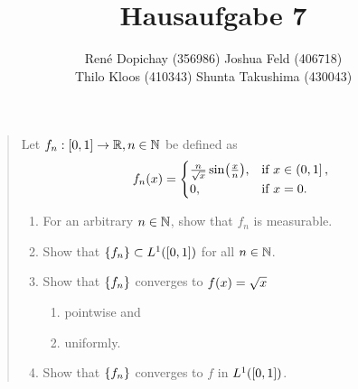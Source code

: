 \documentclass{exercise}
\title{Hausaufgabe 7}
\author{René Dopichay (356986) \quad Joshua Feld (406718)\\Thilo Kloos (410343) \quad Shunta Takushima (430043)}
\begin{document}
	\maketitle


	\section{}

	\begin{quote}
		Let \(f_n: \brackets*{0, 1} \to \R, n \in \N\) be defined as
		\[
			f_n\parentheses*{x} = \begin{cases}
				\frac{n}{\sqrt{x}}\sin\parentheses*{\frac{x}{n}}, & \text{if }x \in \left(0, 1\right],\\
				0, & \text{if }x = 0.
			\end{cases}
		\]
		\begin{enumerate}
			\item For an arbitrary \(n \in \N\), show that \(f_n\) is measurable.
			\item Show that \(\braces*{f_n} \subset L^1\parentheses*{\brackets*{0, 1}}\) for all \(n \in \N\).
			\item Show that \(\braces*{f_n}\) converges to \(f\parentheses*{x} = \sqrt{x}\)
			\begin{enumerate}
				\item pointwise and
				\item uniformly.
			\end{enumerate}
			\item Show that \(\braces*{f_n}\) converges to \(f\) in \(L^1\parentheses*{\brackets*{0, 1}}\).
		\end{enumerate}
	\end{quote}
\end{document}
